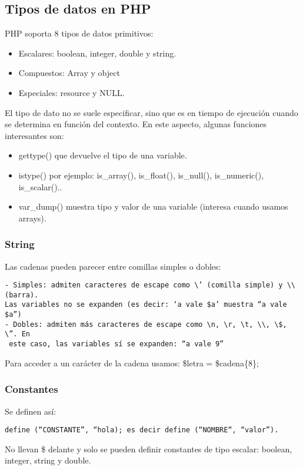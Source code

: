 \documentclass{apuntes}
\begin{document}
\subsection{Tipos de datos en PHP}
PHP soporta 8 tipos de datos primitivos:
\begin{itemize}
\item Escalares: boolean, integer, double y string.
\item Compuestos: Array y object
\item Especiales: resource y NULL.
\end{itemize}
El tipo de dato no se suele especificar, sino que es en tiempo de ejecución cuando se determina en función del contexto. En este aspecto, algunas funciones interesantes son:
\begin{itemize}
\item gettype() que devuelve el tipo de una variable.
\item istype() por ejemplo: is\_array(), is\_float(), is\_null(), is\_numeric(), is\_scalar()..
\item var\_dump() muestra tipo y valor de una variable (interesa cuando usamos arrays).
\end{itemize}

\subsubsection{String}
Las cadenas pueden parecer entre comillas simples o dobles:
\begin{verbatim}
- Simples: admiten caracteres de escape como \’ (comilla simple) y \\ (barra).
Las variables no se expanden (es decir: ‘a vale $a’ muestra “a vale $a”)
- Dobles: admiten más caracteres de escape como \n, \r, \t, \\, \$, \”. En
 este caso, las variables sí se expanden: “a vale 9”
\end{verbatim}
Para acceder a un carácter de la cadena usamos: \$letra = \$cadena\{8\};


\subsubsection{Constantes}
Se definen así:
\begin{verbatim}
define (“CONSTANTE”, “hola); es decir define (“NOMBRE“, “valor”).
\end{verbatim}
No llevan \$ delante y solo se pueden definir constantes de tipo escalar: boolean, integer, string y double.
\end{document}
